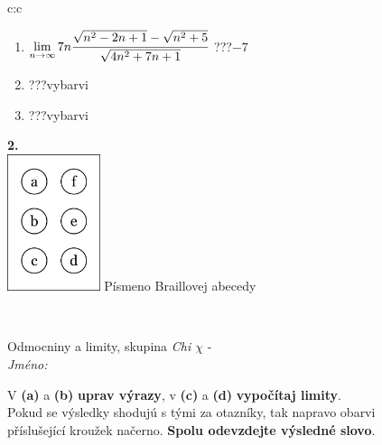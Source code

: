 \documentclass[10pt]{report}
\begin{document}
\begin{tabular}{c:c}
\begin{minipage}[c][104.5mm][t]{0.5\linewidth}
\begin{center}
\begin{minipage}{0.79\linewidth}
\begin{center}
\begin{varwidth}{\linewidth}
\begin{enumerate}
\item $\lim\limits_{n\to\infty}7n\cfrac{\sqrt{n^2-2n+1}-\sqrt{n^2+5}}{\sqrt{4n^2+7n+1}}$\quad \dotfill\; ???\;\dotfill \quad $-7$
\item \quad \dotfill\; ???\;\dotfill \quad vybarvi
\item \quad \dotfill\; ???\;\dotfill \quad vybarvi
\end{enumerate}
\end{varwidth}
\end{center}
\end{minipage}
\begin{minipage}{0.20\linewidth}
\begin{center}
{\Huge\bfseries 2.} \\[2mm]
\includegraphics[height=40mm]{../images/braille.png}
{\small Písmeno Braillovej abecedy}
\end{center}
\end{minipage}
\end{center}
\end{minipage}
\\ \hdashline
\begin{minipage}[c][104.5mm][t]{0.5\linewidth}
\begin{center}
\vspace{7mm}
{\huge Odmocniny a limity, skupina \textit{Chi $\chi$} -}\\[5mm]
\textit{Jméno:}\phantom{xxxxxxxxxxxxxxxxxxxxxxxxxxxxxxxxxxxxxxxxxxxxxxxxxxxxxxxxxxxxxxxxx}\\[5mm]
\begin{minipage}{0.95\linewidth}
\begin{center}
V \textbf{(a)} a \textbf{(b)} \textbf{uprav výrazy}, v \textbf{(c)} a \textbf{(d)} \textbf{vypočítaj limity}.\\Pokud se výsledky shodujú s tými za otazníky, tak napravo obarvi\\příslušející kroužek načerno. \textbf{Spolu odevzdejte výsledné slovo}.
\end{center}
\end{minipage}
\\[1mm]

\end{center}
\end{minipage}
\end{tabular}
\end{document}

